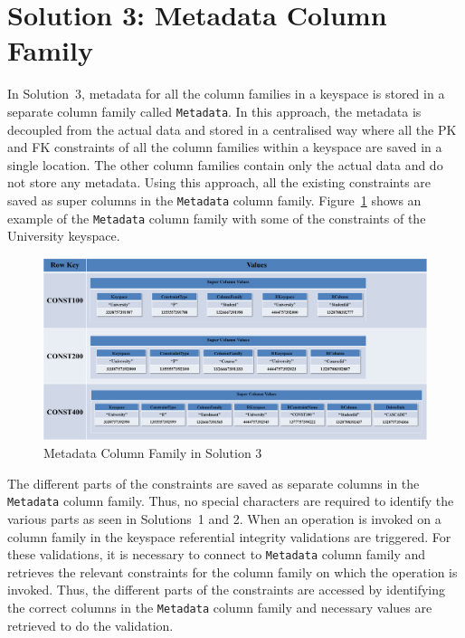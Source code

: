 \section{Solution 3:  Metadata Column Family} \label{s:design-sol3}

In Solution~3,  metadata for all the column families in a keyspace is stored in a
separate column family called \texttt{Metadata}.    In this approach,  the
metadata is decoupled from the actual data and stored in a centralised way where all the
\ac{PK} and \ac{FK} constraints of all the column families within a keyspace are
saved in a single location.   The other column families contain only the actual
data and do not store any metadata.   Using this approach,   all the existing
constraints are saved as super columns in the \texttt{Metadata} column family.  
Figure~\ref{fd:Metadata-Solution3} shows an example of the \texttt{Metadata}
column family with some of the constraints of the University keyspace. 

 	\begin{landscape}
 	\begin{figure}[h] 
		\centering
		\includegraphics[width=1.5\textwidth]{./figure/Solutions/Sol3-MD-ColumnFamily.png}
		\caption{Metadata Column Family in Solution 3}\label{fd:Metadata-Solution3}
	\end{figure}
 	\end{landscape} 
	

The different parts of the constraints are saved as separate columns in the
\texttt{Metadata} column family.  Thus,   no special characters are required to
identify the various parts as seen in Solutions~1 and 2.   When an operation is
invoked on a column family in the keyspace referential integrity validations are
triggered.   For these validations,   it is necessary to connect to
\texttt{Metadata} column family and retrieves the relevant constraints for the
column family on which the operation is invoked. 
Thus,  the different parts of the constraints are accessed by identifying the
correct columns in the \texttt{Metadata} column family and necessary values are
retrieved to do the validation. 


